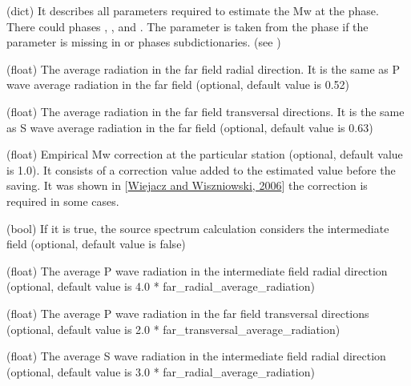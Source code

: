 \documentclass[letterpaper,10pt,english]{sphinxmanual}
\begin{document}
\begin{description}
\sphinxAtStartPar
(dict)
It describes all parameters required to estimate the Mw
at the phase. There could phases , , and .
The parameter is taken from the  phase if the parameter is missing in  or  phases sub\sphinxhyphen{}dictionaries.
(see {\hyperref[\detokenize{configuration:phase-parameters}]{}})

\sphinxAtStartPar
(float)
The average radiation in the far field radial direction.
It is the same as P wave average radiation in the far field (optional, default value is 0.52)

\sphinxAtStartPar
(float)
The average radiation in the far field transversal directions.
It is the same as S wave average radiation in the far field (optional, default value is 0.63)

\sphinxAtStartPar
(float)
Empirical Mw correction at the particular station
(optional, default value is 1.0).
It consists of a correction value added to the estimated value before the saving.
It was shown in {[}\hyperlink{cite.bibliography:id7}{Wiejacz and Wiszniowski, 2006}{]} the correction is required in some cases.

\sphinxAtStartPar
(bool)
If it is true, the source spectrum calculation considers the intermediate field
(optional, default value is false)

\sphinxAtStartPar
(float)
The average P wave radiation in the intermediate field radial
direction (optional, default value is 4.0 * far\_radial\_average\_radiation)

\sphinxAtStartPar
(float)
The average P wave radiation in the far field transversal
directions (optional, default value is \sphinxhyphen{}2.0 * far\_transversal\_average\_radiation)

\sphinxAtStartPar
(float)
The average S wave radiation in the intermediate field radial
direction (optional, default value is \sphinxhyphen{}3.0 * far\_radial\_average\_radiation)


\end{description}
\end{document}
